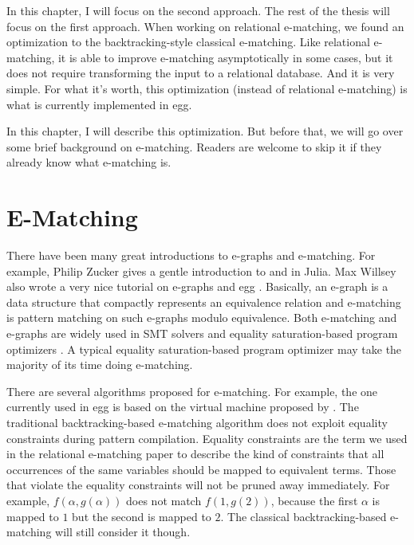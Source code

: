 In this chapter,
 I will focus on the second approach.
The rest of the thesis will focus on the first approach.
When working on relational e-matching, 
 we found an optimization to the backtracking-style classical e-matching.
Like relational e-matching, 
 it is able to improve e-matching asymptotically in some cases, 
 but it does not require transforming the input \egraph to a relational database.
And it is very simple.
For what it's worth, 
 this optimization (instead of relational e-matching) is what is currently
 implemented in egg.

In this chapter, I will describe this optimization.
But before that,
 we will go over some brief background on e-matching.
Readers are welcome to skip it if they already know what e-matching is.

\section{E-Matching}\label{e-matching}

There have been many great introductions to e-graphs and e-matching.
For example, 
 Philip Zucker gives
 a gentle introduction to 
 \egraphs \citep{zucker-egraph-1} and
 \ematching \citep{zucker-egraph-2} in Julia.
Max Willsey also wrote a very nice tutorial \citep{egg-tutorial}
 on e-graphs and egg \citep{egg}.
Basically, 
 an e-graph is a data structure that compactly represents 
 an equivalence relation and 
 e-matching is pattern matching
 on such e-graphs modulo equivalence.
Both e-matching and e-graphs are widely used in
 SMT solvers \citep{efficient-ematching}
 and equality saturation-based
 program optimizers \citep{tensat}.
A typical equality saturation-based program optimizer may
 take the majority of its time doing e-matching.

There are several algorithms proposed for e-matching.
For example,
 the one currently used in egg is based
 on the virtual machine proposed by \citet{efficient-ematching}.
The traditional backtracking-based e-matching algorithm
 does not exploit equality constraints during pattern compilation.
Equality constraints are the term we used in the relational e-matching paper
 to describe the kind of constraints that all occurrences of the same variables should be mapped
 to equivalent terms.
Those that violate the equality constraints will
 not be pruned away immediately.
For example, \(f(\alpha, g(\alpha))\)
 does not match \(f(1,g(2))\), 
 because the first \(\alpha\) is mapped to
 $1$ but the second is mapped to $2$.
The classical backtracking-based
 e-matching will still consider it though.

